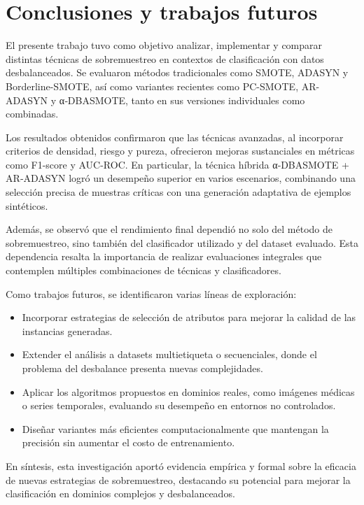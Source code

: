 \section{Conclusiones y trabajos futuros}

El presente trabajo tuvo como objetivo analizar, implementar y comparar distintas técnicas de sobremuestreo en contextos de clasificación con datos desbalanceados. Se evaluaron métodos tradicionales como SMOTE, ADASYN y Borderline-SMOTE, así como variantes recientes como PC-SMOTE, AR-ADASYN y α‑DBASMOTE, tanto en sus versiones individuales como combinadas.

Los resultados obtenidos confirmaron que las técnicas avanzadas, al incorporar criterios de densidad, riesgo y pureza, ofrecieron mejoras sustanciales en métricas como F1-score y AUC-ROC. En particular, la técnica híbrida α‑DBASMOTE + AR‑ADASYN logró un desempeño superior en varios escenarios, combinando una selección precisa de muestras críticas con una generación adaptativa de ejemplos sintéticos.

Además, se observó que el rendimiento final dependió no solo del método de sobremuestreo, sino también del clasificador utilizado y del dataset evaluado. Esta dependencia resalta la importancia de realizar evaluaciones integrales que contemplen múltiples combinaciones de técnicas y clasificadores.

Como trabajos futuros, se identificaron varias líneas de exploración:

\begin{itemize}
  \item Incorporar estrategias de selección de atributos para mejorar la calidad de las instancias generadas.
  \item Extender el análisis a datasets multietiqueta o secuenciales, donde el problema del desbalance presenta nuevas complejidades.
  \item Aplicar los algoritmos propuestos en dominios reales, como imágenes médicas o series temporales, evaluando su desempeño en entornos no controlados.
  \item Diseñar variantes más eficientes computacionalmente que mantengan la precisión sin aumentar el costo de entrenamiento.
\end{itemize}

En síntesis, esta investigación aportó evidencia empírica y formal sobre la eficacia de nuevas estrategias de sobremuestreo, destacando su potencial para mejorar la clasificación en dominios complejos y desbalanceados.
